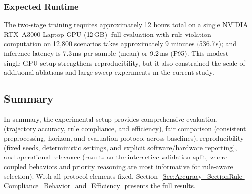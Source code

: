\subsubsection{Expected Runtime}

The two-stage training requires approximately 12 hours total on a single NVIDIA RTX~A3000 Laptop GPU (12\,GB); full evaluation with rule violation computation on 12{,}800 scenarios takes approximately 9 minutes (536.7\,s); and inference latency is 7.3\,ms per sample (mean) or 9.2\,ms (P95).  This modest single-GPU setup strengthens reproducibility, but it also constrained the scale of additional ablations and large-sweep experiments in the current study.
\subsection{Summary}
\label{subsec:setup_summary}

In summary, the experimental setup provides comprehensive evaluation (trajectory accuracy, rule compliance, and efficiency), fair comparison (consistent preprocessing, horizon, and evaluation protocol across baselines), reproducibility (fixed seeds, deterministic settings, and explicit software/hardware reporting), and operational relevance (results on the interactive validation split, where coupled behaviors and priority reasoning are most informative for rule-aware selection).  With all protocol elements fixed, Section~\ref{Sec:Accuracy_SectionRule-Compliance_Behavior_and_Efficiency} presents the full results.

